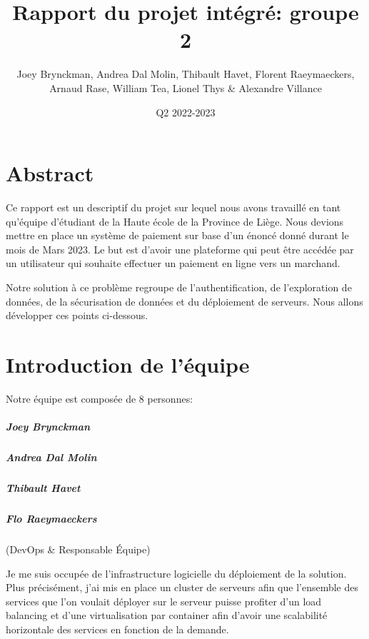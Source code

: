 \documentclass[11pt]{report}
\title{Rapport du projet intégré: groupe 2}
\author{Joey Brynckman, Andrea Dal Molin, Thibault Havet, Florent Raeymaeckers,  \\ Arnaud Rase, William Tea, Lionel Thys \& Alexandre Villance}
\date{Q2 2022-2023}
\begin{document}
\maketitle

\tableofcontents

\chapter*{Abstract}

Ce rapport est un descriptif du projet sur lequel nous avons travaillé en tant qu'équipe d'étudiant de la Haute école de la Province de Liège. Nous devions mettre en place un système de paiement sur base d'un énoncé donné durant le mois de Mars 2023. Le but est d'avoir une plateforme qui peut être accédée par un utilisateur qui souhaite effectuer un paiement en ligne vers un marchand.

Notre solution à ce problème regroupe de l'authentification, de l'exploration de données, de la sécurisation de données et du déploiement de serveurs. Nous allons développer ces points ci-dessous.

\chapter{Introduction de l'équipe}

Notre équipe est composée de 8 personnes:

\paragraph{Joey Brynckman}
\paragraph{Andrea Dal Molin}
\paragraph{Thibault Havet}
\paragraph{Flo Raeymaeckers} (DevOps \& Responsable Équipe)

Je me suis occupée de l'infrastructure logicielle du déploiement de la solution. Plus précisément, j'ai mis en place un cluster de serveurs afin que l'ensemble des services que l'on voulait déployer sur le serveur puisse profiter d'un load balancing et d'une virtualisation par container afin d'avoir une scalabilité horizontale des services en fonction de la demande.
\end{document}
